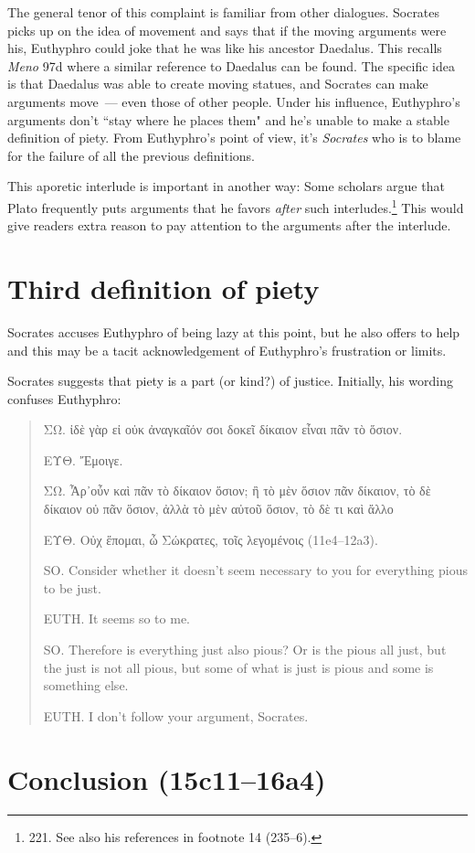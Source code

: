 \documentclass[11pt]{article}
\begin{document}
The general tenor of this complaint is familiar from other dialogues.
Socrates picks up on the idea of movement and says that if the moving
arguments were his, Euthyphro could joke that he was like his ancestor
Daedalus.  This recalls \emph{Meno} 97d where a similar reference to
Daedalus can be found.  The specific idea is that Daedalus was able to
create moving statues, and Socrates can make arguments move~--- even those
of other people.  Under his influence, Euthyphro's arguments don't ``stay
where he places them" and he's unable to make a stable definition of piety.
From Euthyphro's point of view, it's \emph{Socrates} who is to blame for
the failure of all the previous definitions.

This aporetic interlude is important in another way: Some scholars argue
that Plato frequently puts arguments that he favors \emph{after} such
interludes.\footnote{\citet{mcpherran1992} 221.  See also his references
in footnote 14 (235--6).}  This would give readers extra reason to pay
attention to the arguments after the interlude.

\section{Third definition of piety}

Socrates accuses Euthyphro of being lazy at this point, but he also
offers to help and this may be a tacit acknowledgement of Euthyphro's
frustration or limits.

Socrates suggests that piety is a part (or kind?) of justice. Initially,
his wording confuses Euthyphro:

\begin{quote}
    ΣΩ. ἰδὲ γὰρ εἰ οὐκ ἀναγκαῖόν σοι δοκεῖ δίκαιον εἶναι πᾶν τὸ ὅσιον.

    ΕΥΘ. Ἔμοιγε.

    ΣΩ. Ἆρ᾽οὖν καὶ πᾶν τὸ δίκαιον ὅσιον; ἢ τὸ μὲν ὅσιον πᾶν δίκαιον, τὸ δὲ
    δίκαιον οὐ πᾶν ὅσιον, ἀλλὰ τὸ μὲν αὐτοῦ ὅσιον, τὸ δὲ τι καὶ ἄλλο

    ΕΥΘ. Οὐχ ἕπομαι, ὦ Σώκρατες, τοῖς λεγομένοις (11e4--12a3).

    SO. Consider whether it doesn't seem necessary to you for everything
    pious to be just.

    EUTH. It seems so to me.

    SO. Therefore is everything just also pious? Or is the pious all just,
    but the just is not all pious, but some of what is just is pious and
    some is something else.

    EUTH. I don't follow your argument, Socrates.
\end{quote}

\section{Conclusion (15c11--16a4)}

\newpage


\end{document}
